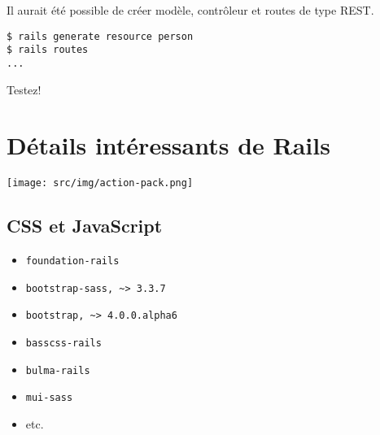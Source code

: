 Il aurait été possible de créer modèle, contrôleur et routes de type
REST.

\begin{otherlanguage}{english}

\begin{verbatim}
$ rails generate resource person
$ rails routes
...
\end{verbatim}

\end{otherlanguage}

Testez!

\hypertarget{duxe9tails-intuxe9ressants-de-rails}{%
\section{Détails intéressants de
Rails}\label{duxe9tails-intuxe9ressants-de-rails}}

\texttt{[image: src/img/action-pack.png]}

\hypertarget{css-et-javascript}{%
\subsection{CSS et JavaScript}\label{css-et-javascript}}

\begin{itemize}
\tightlist
\item
  \begin{otherlanguage}{english}\texttt{foundation-rails}\end{otherlanguage}
\item
  \begin{otherlanguage}{english}\texttt{bootstrap-sass,\ \textasciitilde{}\textgreater{}\ 3.3.7}\end{otherlanguage}
\item
  \begin{otherlanguage}{english}\texttt{bootstrap,\ \textasciitilde{}\textgreater{}\ 4.0.0.alpha6}\end{otherlanguage}
\item
  \begin{otherlanguage}{english}\texttt{basscss-rails}\end{otherlanguage}
\item
  \begin{otherlanguage}{english}\texttt{bulma-rails}\end{otherlanguage}
\item
  \begin{otherlanguage}{english}\texttt{mui-sass}\end{otherlanguage}
\item
  etc.
\end{itemize}

